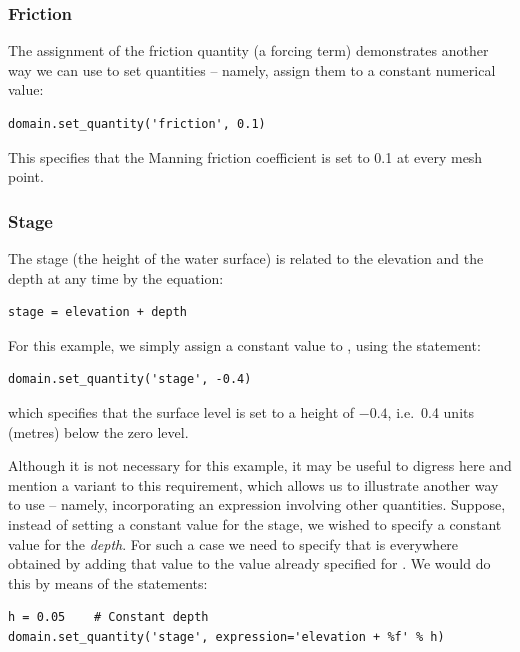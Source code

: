 \documentclass{manual}
\begin{document}
\subsubsection{Friction}

The assignment of the friction quantity (a forcing term)
demonstrates another way we can use  to set
quantities -- namely, assign them to a constant numerical value:

\begin{verbatim}
domain.set_quantity('friction', 0.1)
\end{verbatim}

This specifies that the Manning friction coefficient is set to 0.1
at every mesh point.

\subsubsection{Stage}

The stage (the height of the water surface) is related to the
elevation and the depth at any time by the equation:

\begin{verbatim}
stage = elevation + depth
\end{verbatim}

For this example, we simply assign a constant value to ,
using the statement:

\begin{verbatim}
domain.set_quantity('stage', -0.4)
\end{verbatim}

which specifies that the surface level is set to a height of $-0.4$,
i.e.\ 0.4 units (metres) below the zero level.

Although it is not necessary for this example, it may be useful to
digress here and mention a variant to this requirement, which allows
us to illustrate another way to use  -- namely,
incorporating an expression involving other quantities. Suppose,
instead of setting a constant value for the stage, we wished to
specify a constant value for the \emph{depth}. For such a case we
need to specify that  is everywhere obtained by adding
that value to the value already specified for . We
would do this by means of the statements:

\begin{verbatim}
h = 0.05    # Constant depth
domain.set_quantity('stage', expression='elevation + %f' % h)
\end{verbatim}
\end{document}
